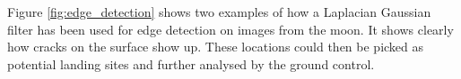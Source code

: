 Figure \ref{fig:edge_detection} shows two examples of how a Laplacian Gaussian filter has been used for edge detection on images from the moon. It shows clearly how cracks on the surface show up. These locations could then be picked as potential landing sites and further analysed by the ground control.

\begin{figure}[htb]
	\centering
	\\
\end{figure}
